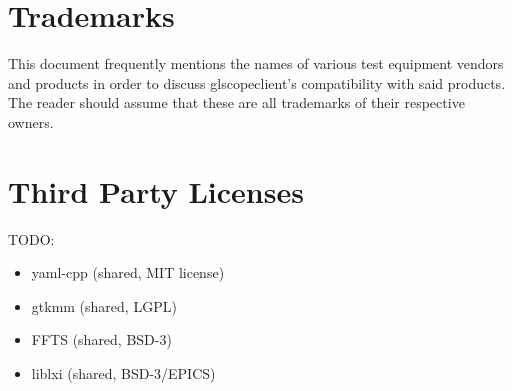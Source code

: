 \section{Trademarks}

This document frequently mentions the names of various test equipment vendors and products in order to discuss
glscopeclient's compatibility with said products. The reader should assume that these are all trademarks of their
respective owners.

\section{Third Party Licenses}

TODO:
\begin{itemize}
\item yaml-cpp (shared, MIT license)
\item gtkmm (shared, LGPL)
\item FFTS (shared, BSD-3)
\item liblxi (shared, BSD-3/EPICS)
\end{itemize}
